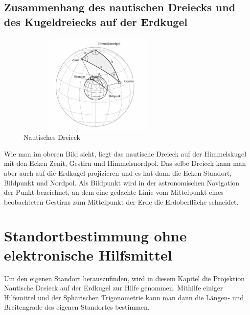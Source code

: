 \subsection{Zusammenhang des nautischen Dreiecks und des Kugeldreiecks auf der Erdkugel}
\begin{figure}
	\begin{center}
		\includegraphics[height=5cm,width=8cm]{papers/nav/bilder/kugel3.png}
		\caption[Nautisches Dreieck]{Nautisches Dreieck}
	\end{center}
\end{figure}

Wie man im oberen Bild sieht, liegt das nautische Dreieck auf der Himmelskugel mit den Ecken Zenit, Gestirn und Himmelsnordpol. 
Das selbe Dreieck kann man aber auch auf die Erdkugel projizieren und es hat dann die Ecken Standort, Bildpunkt und Nordpol. 
Als Bildpunkt wird in der astronomischen Navigation der Punkt bezeichnet, an dem eine gedachte Linie vom Mittelpunkt eines beobachteten Gestirns zum Mittelpunkt der Erde die Erdoberfläche schneidet.


\section{Standortbestimmung ohne elektronische Hilfsmittel}
Um den eigenen Standort herauszufinden, wird in diesem Kapitel die Projektion Nautische Dreieck auf der Erdkugel zur Hilfe genommen. 
Mithilfe einiger Hilfsmittel und der Sphärischen Trigonometrie kann man dann die Längen- und Breitengrade des eigenen Standortes bestimmen.

